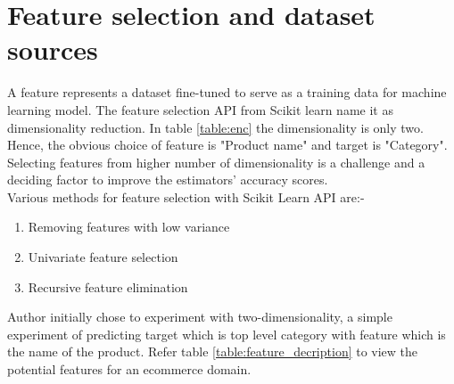 





\section {Feature selection and dataset sources}

A feature represents a dataset fine-tuned to serve as a training data for machine learning model. The feature selection API from Scikit learn \parencite{sklearn_api} name it as dimensionality reduction. In table \ref{table:enc} the dimensionality is only two. Hence, the obvious choice of feature is "Product name" and target is "Category". Selecting features from higher number of dimensionality is a challenge and a deciding factor to improve the estimators' accuracy scores.\\ 
Various methods for feature selection with Scikit Learn API are:-
\begin{enumerate}
      \item Removing features with low variance
      \item Univariate feature selection
      \item Recursive feature elimination

\end{enumerate}


 Author initially chose to experiment with two-dimensionality, a simple experiment of predicting target which is top level category with feature which is the name of the product. Refer table \ref{table:feature_decription} to view the potential features for an ecommerce domain. 


